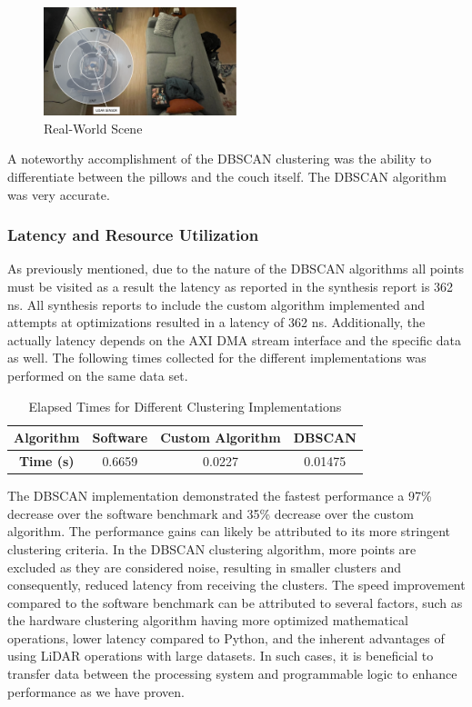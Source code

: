 \documentclass[journal]{IEEEtran} %
\begin{document}
\begin{figure}[h]
\centering
\includegraphics[width=0.5\textwidth]{realWorldScene}
\caption{Real-World Scene}
\label{fig:realworld}
\end{figure}

A noteworthy accomplishment of the DBSCAN clustering was the ability to differentiate between the pillows and the couch itself. The DBSCAN algorithm was very accurate.\\

\subsubsection{Latency and Resource Utilization}

As previously mentioned, due to the nature of the DBSCAN algorithms all points must be visited as a result the latency as reported in the synthesis report is 362 ns. All synthesis reports to include the custom algorithm implemented and attempts at optimizations resulted in a latency of 362 ns. Additionally, the actually latency depends on the AXI DMA stream interface and the specific data as well. The following times collected for the different implementations was performed on the same data set.

\begin{table}[h]
\centering
\begin{tabular}{|c|c c c|}
\hline
\textbf{Algorithm} & \textbf{Software} & \textbf{Custom Algorithm} & \textbf{DBSCAN} \\
 \hline
\textbf{Time (s)} & 0.6659 & 0.0227 & 0.01475 \\
 \hline
\end{tabular}
\caption{Elapsed Times for Different Clustering Implementations}
\label{table:processing_times}
\end{table}

The DBSCAN implementation demonstrated the fastest performance a 97\% decrease over the software benchmark and 35\% decrease over the custom algorithm. The performance gains can likely be attributed to its more stringent clustering criteria. In the DBSCAN clustering algorithm, more points are excluded as they are considered noise, resulting in smaller clusters and consequently, reduced latency from receiving the clusters. The speed improvement compared to the software benchmark can be attributed to several factors, such as the hardware clustering algorithm having more optimized mathematical operations, lower latency compared to Python, and the inherent advantages of using LiDAR operations with large datasets. In such cases, it is beneficial to transfer data between the processing system and programmable logic to enhance performance as we have proven.\\
\end{document}
